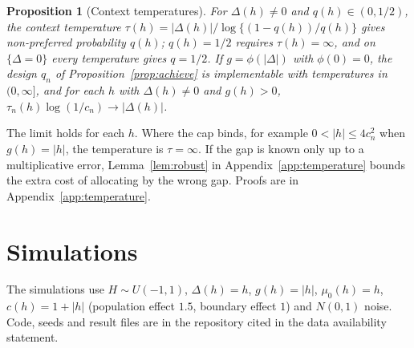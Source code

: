 \documentclass[12pt]{article}
\newtheorem{proposition}{Proposition}
\theoremstyle{definition}
\theoremstyle{remark}
\begin{document}
\begin{proposition}[Context temperatures]\label{prop:ctx}
For $\Delta(h)\neq0$ and $q(h)\in(0,1/2)$, the context temperature
$\tau(h)=|\Delta(h)|/\log\{(1-q(h))/q(h)\}$ gives non-preferred probability $q(h)$;
$q(h)=1/2$ requires $\tau(h)=\infty$, and on $\{\Delta=0\}$ every temperature gives
$q=1/2$. If $g=\phi(|\Delta|)$ with $\phi(0)=0$, the design $q_n$ of
Proposition~\ref{prop:achieve} is implementable with temperatures in $(0,\infty]$,
and for each $h$ with $\Delta(h)\neq0$ and $g(h)>0$, $\tau_n(h)\log(1/c_n)\to|\Delta(h)|$.
\end{proposition}

The limit holds for each $h$. Where the cap binds, for example $0<|h|\le4c_n^2$ when
$g(h)=|h|$, the temperature is $\tau=\infty$. If the gap is known only up to a
multiplicative error, Lemma~\ref{lem:robust} in Appendix~\ref{app:temperature} bounds
the extra cost of allocating by the wrong gap. Proofs are in
Appendix~\ref{app:temperature}.

\section{Simulations}\label{sec:sims}

The simulations use $H\sim U(-1,1)$, $\Delta(h)=h$, $g(h)=|h|$, $\mu_0(h)=h$,
$c(h)=1+|h|$ (population effect $1.5$, boundary effect $1$) and $N(0,1)$ noise.
Code, seeds and result files are in the repository cited in the data availability
statement.
\end{document}
